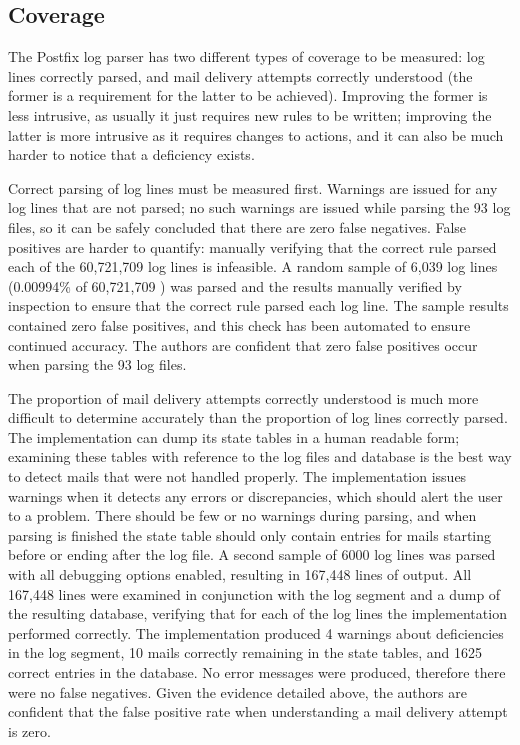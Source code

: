 \documentclass{svmult}
\newcommand{\numberOFlogFILES}[0]{%
    93%
}
\newcommand{\numberOFlogLINES}[0]{%
    60,721,709%
}
\begin{document}
\subsection{Coverage}

\label{coverage}

The Postfix log parser has two different types of coverage to be measured:
log lines correctly parsed, and mail delivery attempts correctly understood
(the former is a requirement for the latter to be achieved).  Improving the
former is less intrusive, as usually it just requires new rules to be
written; improving the latter is more intrusive as it requires changes to
actions, and it can also be much harder to notice that a deficiency exists.

Correct parsing of log lines must be measured first.  Warnings are issued
for any log lines that are not parsed; no such warnings are issued while
parsing the \numberOFlogFILES{} log files, so it can be safely concluded
that there are zero false negatives.  False positives are harder to
quantify: manually verifying that the correct rule parsed each of the
\numberOFlogLINES{} log lines is infeasible.  A random sample of 6,039 log
lines (0.00994\% of \numberOFlogLINES{}) was parsed and the results
manually verified by inspection to ensure that the correct rule parsed each
log line.  The sample results contained zero false positives, and this
check has been automated to ensure continued accuracy.  The authors are
confident that zero false positives occur when parsing the
\numberOFlogFILES{} log files.

The proportion of mail delivery attempts correctly understood is much more
difficult to determine accurately than the proportion of log lines
correctly parsed.  The implementation can dump its state tables in a human
readable form; examining these tables with reference to the log files and
database is the best way to detect mails that were not handled properly.
The implementation issues warnings when it detects any errors or
discrepancies, which should alert the user to a problem.  There should be
few or no warnings during parsing, and when parsing is finished the state
table should only contain entries for mails starting before or ending after
the log file.  A second sample of 6000 log lines was parsed with all
debugging options enabled, resulting in 167,448 lines of output.  All
167,448 lines were examined in conjunction with the log segment and a dump
of the resulting database, verifying that for each of the log lines the
implementation performed correctly.  The implementation produced 4 warnings
about deficiencies in the log segment, 10 mails correctly remaining in the
state tables, and 1625 correct entries in the database.  No error messages
were produced, therefore there were no false negatives.  Given the evidence
detailed above, the authors are confident that the false positive rate when
understanding a mail delivery attempt is zero.
\end{document}
